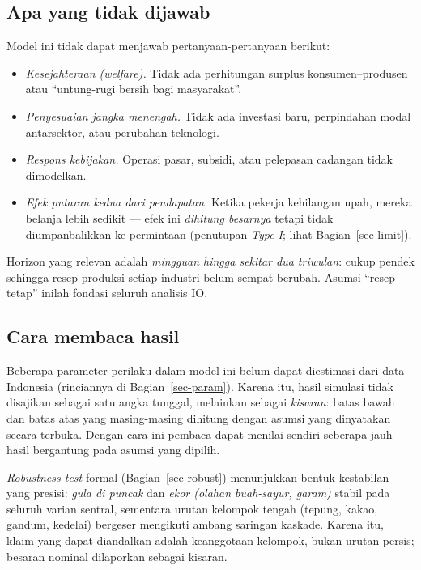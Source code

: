 \documentclass[
  manuscript=article,
  layout=publish,
  year=2026,
  volume=1,
]{den}
\providecommand{\tightlist}{%
  \setlength{\itemsep}{0pt}\setlength{\parskip}{0pt}}
\begin{document}
\subsection{Apa yang tidak dijawab}\label{apa-yang-tidak-dijawab}

Model ini tidak dapat menjawab pertanyaan-pertanyaan berikut:

\begin{itemize}
\tightlist
\item
  \emph{Kesejahteraan (welfare).} Tidak ada perhitungan surplus
  konsumen--produsen atau ``untung-rugi bersih bagi masyarakat''.
\item
  \emph{Penyesuaian jangka menengah.} Tidak ada investasi baru,
  perpindahan modal antarsektor, atau perubahan teknologi.
\item
  \emph{Respons kebijakan.} Operasi pasar, subsidi, atau pelepasan
  cadangan tidak dimodelkan.
\item
  \emph{Efek putaran kedua dari pendapatan.} Ketika pekerja kehilangan
  upah, mereka belanja lebih sedikit --- efek ini \emph{dihitung
  besarnya} tetapi tidak diumpanbalikkan ke permintaan (penutupan
  \emph{Type I}; lihat Bagian~\ref{sec-limit}).
\end{itemize}

Horizon yang relevan adalah \emph{mingguan hingga sekitar dua triwulan}:
cukup pendek sehingga resep produksi setiap industri belum sempat
berubah. Asumsi ``resep tetap'' inilah fondasi seluruh analisis IO.

\subsection{Cara membaca hasil}\label{sec-baca}

Beberapa parameter perilaku dalam model ini belum dapat diestimasi dari
data Indonesia (rinciannya di Bagian~\ref{sec-param}). Karena itu, hasil
simulasi tidak disajikan sebagai satu angka tunggal, melainkan sebagai
\emph{kisaran}: batas bawah dan batas atas yang masing-masing dihitung
dengan asumsi yang dinyatakan secara terbuka. Dengan cara ini pembaca
dapat menilai sendiri seberapa jauh hasil bergantung pada asumsi yang
dipilih.

\emph{Robustness test} formal (Bagian~\ref{sec-robust}) menunjukkan
bentuk kestabilan yang presisi: \emph{gula di puncak} dan \emph{ekor
(olahan buah-sayur, garam)} stabil pada seluruh varian sentral,
sementara urutan kelompok tengah (tepung, kakao, gandum, kedelai)
bergeser mengikuti ambang saringan kaskade. Karena itu, klaim yang dapat
diandalkan adalah keanggotaan kelompok, bukan urutan persis; besaran
nominal dilaporkan sebagai kisaran.
\end{document}
